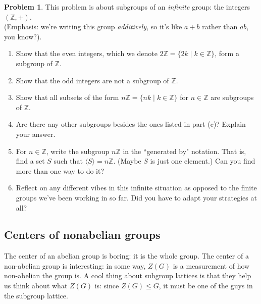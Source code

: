 \documentclass[12pt]{article}
\theoremstyle{definition} %
\newtheorem{problem}{Problem}
\begin{document}
\begin{problem}\label{prob:nZ}
    This problem is about subgroups of an \textit{infinite} group: the integers $(\mathbb{Z},+)$. \\
    (Emphasis: we're writing this group \textit{additively}, so it's like $a+b$ rather than $ab$, you know?).
    \begin{enumerate}[label=\textrm{(\alph*)}]
        \item Show that the even integers, which we denote $2\mathbb{Z}=\{2k\mid k\in\mathbb{Z}\}$, form a subgroup of $\mathbb{Z}$.
        \item Show that the odd integers are not a subgroup of $\mathbb{Z}$.
        \item Show that all subsets of the form $n\mathbb{Z}=\{nk\mid k\in\mathbb{Z}\}$ for $n\in\mathbb{Z}$ are subgroups of $\mathbb{Z}$.
        \item\label{prob:nZothers} Are there any other subgroups besides the ones listed in part (c)?  Explain your answer.
        \item For $n\in \mathbb{Z}$, write the subgroup $n\mathbb{Z}$ in the ``generated by" notation.  That is, find a set $S$ such that $\langle S\rangle =n\mathbb{Z}$. (Maybe $S$ is just one element.)  Can you find more than one way to do it?
        \item Reflect on any different vibes in this infinite situation as opposed to the finite groups we've been working in so far. Did you have to adapt your strategies at all?
    \end{enumerate}
\end{problem}

\subsection*{Centers of nonabelian groups}
The center of an abelian group is boring: it is the whole group. The center of a non-abelian group is interesting: in some way, $Z(G)$ is a measurement of how non-abelian the group is. A cool thing about subgroup lattices is that they help us think about what $Z(G)$ is: since $Z(G) \leq G$, it must be one of the guys in the subgroup lattice.
\end{document}
